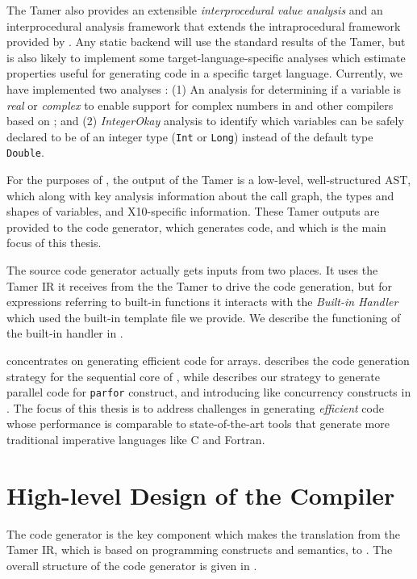 The Tamer also provides an extensible \textit{interprocedural value
analysis} and an interprocedural analysis framework that extends the
intraprocedural framework provided by \mcsaf.   Any static backend will
use the standard results of the Tamer,  but is also likely to implement
some target-language-specific analyses which estimate properties useful
for generating code in a specific target language. Currently, we have
implemented two analyses : (1) An analysis for determining if a \matlab
variable is \textit{real} or \textit{complex} to enable support for
complex numbers in \mixten and other \matlab compilers based on \mclab;
and (2) \emph{IntegerOkay} analysis to identify which variables can be
safely declared to be of an integer type (\texttt{Int} or \texttt{Long})
instead of the default type \texttt{Double}.  

For the purposes of \mixten, the output of the Tamer is a low-level,
well-structured AST, which along with key analysis information about the
call graph,  the types and shapes of variables, and X10-specific
information.   These Tamer outputs are provided to the code generator,
which generates \xten code, and which is the main focus of this thesis.

The \xten source code generator actually gets inputs from two places.  It uses
the Tamer IR it receives from the the Tamer to drive the code generation,  but
for expressions referring to built-in \matlab functions it interacts with the
\textit{Built-in Handler} which used the built-in template file we provide.  We
describe the functioning of the
built-in handler in . 

 concentrates on generating efficient code for \matlab
arrays.   describes the code generation strategy for
the sequential core of \matlab, while  describes our
strategy to generate parallel \xten code for \matlab \texttt{parfor} construct,
and introducing \xten like concurrency constructs in \matlab. The focus of this
thesis is to address challenges in generating \emph{efficient} \xten code whose
performance is comparable to state-of-the-art tools that generate more
traditional imperative languages like C and Fortran.

\section{High-level Design of the \mixten Compiler}

The \mixten code generator is the key component which makes the
translation from the Tamer IR, which is based on \matlab programming
constructs and semantics,  to \xten.  The overall structure of the
\mixten code generator is given in .

